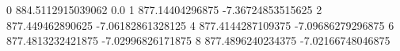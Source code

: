 0 884.5112915039062 0.0
1 877.14404296875 -7.36724853515625
2 877.449462890625 -7.06182861328125
4 877.4144287109375 -7.09686279296875
6 877.4813232421875 -7.02996826171875
8 877.4896240234375 -7.02166748046875
